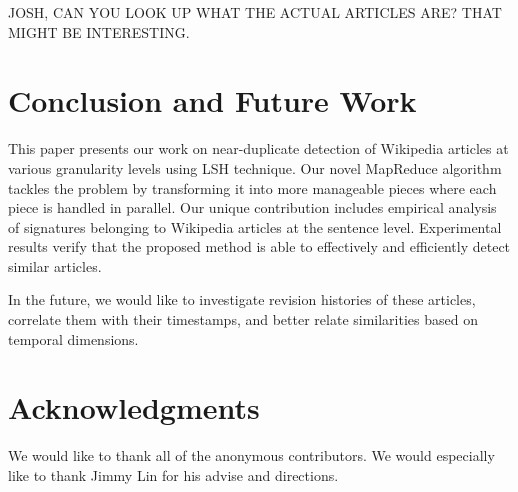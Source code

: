 \documentclass{acm_proc_article-sp}
\begin{document}
JOSH, CAN YOU LOOK UP WHAT THE ACTUAL ARTICLES ARE? THAT MIGHT BE INTERESTING.


\section{Conclusion and Future Work}
This paper presents our work on near-duplicate detection of Wikipedia articles at various granularity levels using LSH technique. Our novel MapReduce algorithm tackles the problem by transforming it into more manageable pieces where each piece is handled in parallel. Our unique contribution includes empirical analysis of signatures belonging to Wikipedia articles at the sentence level. Experimental results verify that the proposed method is able to effectively and efficiently detect similar articles.

In the future, we would like to investigate revision histories of these articles, correlate them with their timestamps, and better relate similarities based on temporal dimensions. 

\section{Acknowledgments}
We would like to thank all of the anonymous contributors. We would especially like to thank Jimmy Lin for his advise and directions.



\balancecolumns
\end{document}
